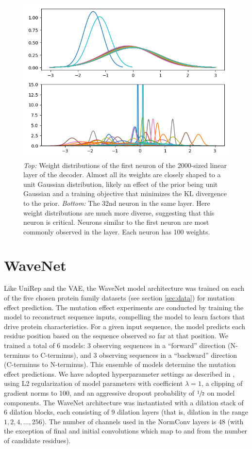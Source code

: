 \begin{figure}[H]
    \centering
    \includegraphics[width = 0.8\linewidth]{report/figures/bayesian_weighs.png}
    \caption{\textit{Top:} Weight distributions of the first neuron of the 2000-sized linear layer of the decoder. Almost all its weights are closely shaped to a unit Gaussian distribution, likely an effect of the prior being unit Gaussian and a training objective that minimizes the KL divergence to the prior. \textit{Bottom:} The 32nd neuron in the same layer. Here weight distributions are much more diverse, suggesting that this neuron is critical. Neurons similar to the first neuron are most commonly observed in the layer. Each neuron has 100 weights.}
    \label{fig:bayesian_weights}
\end{figure}

\section{WaveNet}
\label{sec:wavenet_experiment}
Like UniRep and the VAE, the WaveNet model architecture was trained on each of the five chosen protein family datasets (see section \ref{sec:data}) for mutation effect prediction. The mutation effect experiments are conducted by training the model to reconstruct sequence inputs, compelling the model to learn factors that drive protein characteristics. For a given input sequence, the model predicts each residue position based on the sequence observed so far at that position. We trained a total of 6 models: 3 observing sequences in a ``forward'' direction (N-terminus to C-terminus), and 3 observing sequences in a ``backward'' direction (C-terminus to N-terminus). This ensemble of models determine the mutation effect predictions. We have adopted hyperparameter settings as described in \textcite{riesselman2019accelerating}, using L2 regularization of model parameters with coefficient $\lambda = 1$, a clipping of gradient norms to 100, and an aggressive dropout probability of $\sfrac{1}{2}$ on model components. The WaveNet architecture was instantiated with a dilation stack of 6 dilation blocks, each consisting of 9 dilation layers (that is, dilation in the range $1, 2, 4, \ldots, 256$). The number of channels used in the NormConv layers is 48 (with the exception of final and initial convolutions which map to and from the number of candidate residues).

